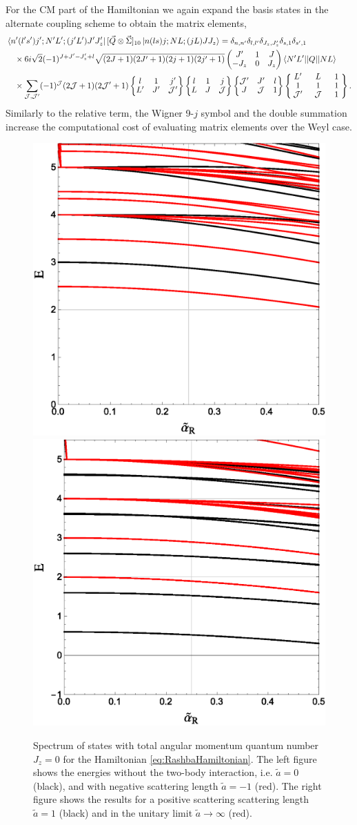 \documentclass[%
 preprint,
 amsmath,amssymb,
 aps,
]{revtex4-1}
\newcommand{\threej}[6]{ \begin{pmatrix}
  #1 & #2 & #3 \\
  #4 & #5 & #6 
 \end{pmatrix}}
\newcommand{\sixj}[6]{ \begin{Bmatrix}
  #1 & #2 & #3 \\
  #4 & #5 & #6 
 \end{Bmatrix}}
\newcommand{\ninej}[9]{ \begin{Bmatrix}
  #1 & #2 & #3 \\
  #4 & #5 & #6 \\
  #7 & #8 & #9
 \end{Bmatrix}}
\begin{document}
For the CM part of the Hamiltonian we again expand the basis states in the alternate coupling scheme to obtain the matrix elements,
\begin{equation}\begin{split}
&\bra{n'(l's')j';N'L';(j'L')J'J'_z} [ \vec{Q} \otimes \vec{\Sigma} ]_{10}  \ket{n(ls)j;NL;(jL)JJ_z} = \delta_{n,n'}\delta_{l,l'}\delta_{J_z,J'_z}\delta_{s,1}\delta_{s',1} \\
 &\quad\times 6 i \sqrt{2}(-1)^{J+J'-J'_z+l} \sqrt{(2J+1)(2J'+1)(2j+1)(2j'+1)} \threej{J'}{1}{J}{-J_z}{0}{J_z}  \braket{N' L' || Q || N L} \\ 
 &\quad\times\sum_{\mathcal{J},\mathcal{J}'} (-1)^\mathcal{J}(2\mathcal{J}+1)(2\mathcal{J}'+1)\sixj{l}{1}{j'}{L'}{J'}{\mathcal{J}'}\sixj{l}{1}{j}{L}{J}{\mathcal{J}}\sixj{\mathcal{J}'}{J'}{l}{J}{\mathcal{J}}{1}
 \renewcommand{\arraystretch}{0.9}
 \ninej{\hphantom{l}L'\hphantom{l}}{\hphantom{l}L\hphantom{l}}{\hphantom{l}1\hphantom{l}}{1}{1}{1}{\mathcal{J}'}{\mathcal{J}}{1} .
\end{split}
\end{equation}
Similarly to the relative term, the Wigner 9-$j$ symbol and the double summation  increase the computational cost of evaluating matrix elements over the Weyl case.

\begin{figure}
\includegraphics[width=0.5\linewidth]{Figures/Rashbaa0am1}\nobreak
\includegraphics[width=0.5\linewidth]{Figures/Rashbaa1aInf}
\caption{\label{fig:RashbaSpectrum} Spectrum of states with total angular momentum quantum number $J_z=0$ for the Hamiltonian \eqref{eq:RashbaHamiltonian}. The left figure shows the energies without the two-body interaction, i.e. $\tilde{a}=0$ (black), and with negative scattering length $\tilde{a}=-1$ (red). The right figure shows the results for a positive scattering scattering length $\tilde{a}=1$ (black) and in the unitary limit $\tilde{a}\rightarrow\infty$ (red).} 
\end{figure}
\end{document}
